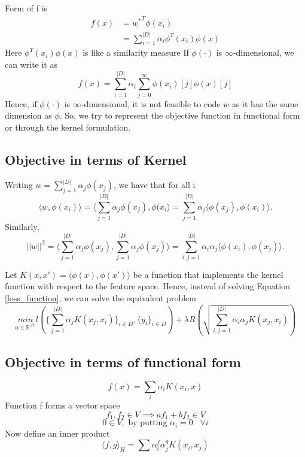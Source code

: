 \documentclass[12pt]{article}
\begin{document}
Form of f is 
\begin{align*}
    f(x) &= {w^{*}}^{T}\phi(x_{i})  \\
        &= \sum_{i = 1}^{|D|} \alpha_{i} \phi^{T}(x_{i}) \phi(x)
\end{align*}
Here $\phi^{T}(x_{i}) \phi(x)$ is like a similarity measure
If $\phi(\cdot)$ is $\infty$-dimensional, we can write it as 
\[ f(x) =  \sum_{i = 1}^{|D|} \alpha_{i} \sum_{j=0}^{\infty} \phi(x_{i})[j] \phi(x)[j]\]
Hence, if $\phi(\cdot)$ is $\infty$-dimensional, it is not feasible to code $w$ as it has the same 
dimension as $\phi$. So, we try to represent the objective function in functional form or through the kernel formulation.

\subsection{Objective in terms of Kernel}
Writing $w = \sum_{j=1}^{|D|} \alpha_{j} \phi(x_j)$, we have that for all i
\[\langle w, \phi(x_{i})\rangle = \langle \sum_{j=1}^{|D|} \alpha_{j} \phi(x_j),\phi(x_{i}\rangle = \sum_{j = 1}^{|D|} \alpha_j \langle \phi(x_j), \phi(x_i)\rangle .\]
Similarly,
\[ ||w||^{2}  = \langle \sum_{j=1}^{|D|} \alpha_{j} \phi(x_j), \sum_{j=1}^{|D|} \alpha_{j} \phi(x_j) \rangle =  \sum_{i,j = 1}^{|D|} \alpha_i \alpha_j \langle \phi(x_i), \phi(x_j)\rangle .\]

Let $K(x,x') = \langle \phi(x), \phi(x') \rangle$ be a function that implements the kernel function
with respect to the feature space.
Hence, instead of solving Equation \ref{loss_function}, we can solve the equivalent problem
\begin{equation}
\underset{\alpha \in \mathbb{R}^{|D|}}{min}  l (\{\sum_{j=1}^{|D|}\alpha_j K(x_j,x_{i})\}_{i \in D}, \{y_{i}\}_{i \in D} ) + \lambda R(\sqrt{\sum_{i,j =1}^{|D|} \alpha_i \alpha_j K(x_{j},x_{i})})   
\end{equation}

\subsection{Objective in terms of functional form}
\[f(x) = \sum_{i} \alpha_{i} K(x_{i},x)\]
Function f forms a vector space
\[f_{1}, f_{2} \in V \implies af_{1} + bf_{2} \in V\] 
\[ 0 \in V, \text{ by putting  } \alpha_{i} = 0 \; \; \; \forall i  \]
Now define an inner product 
\begin{equation}
    \label{ip}
    {\langle f,g \rangle}_{H} = \sum \alpha_{i}^{f} \alpha_{j}^{g} K(x_{i},x_{j})
\end{equation}
\end{document}
